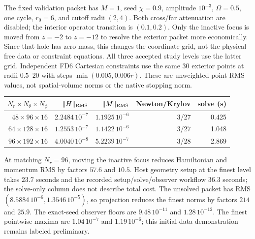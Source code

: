 \documentclass[aps,prd,preprint,notitlepage,nofootinbib]{revtex4-2}
\begin{document}
The fixed validation packet has $M=1$, seed $\chi=0.9$, amplitude
$10^{-3}$, $\Omega=0.5$, one cycle, $r_0=6$, and cutoff radii $(2,4)$.
Both cross/far attenuation are disabled; the interior operator transition
is $(0.1,0.2)$. Only the inactive focus is moved from $z=-2$ to $z=-12$ to
resolve the exterior packet more economically. Since that hole has zero
mass, this changes the coordinate grid, not the physical free data or
constraint equations. All three accepted study levels use the latter grid.
Independent FD6 Cartesian constraints use the same 30 exterior points at
radii $0.5$--$20$ with steps $\min(0.005,0.006r)$. These are unweighted
point RMS values, not spatial-volume norms or the native stopping norm.
\begin{center}
\begin{tabular}{rrrrr}
\toprule
$N_r\times N_\theta\times N_\phi$ & $\|H\|_{\rm RMS}$ &
$\|M\|_{\rm RMS}$ & Newton/Krylov & solve (s)\\
\midrule
$48\times96\times16$ & $2.2484\,10^{-7}$ & $1.1925\,10^{-6}$ & 3/27 & 0.425\\
$64\times128\times16$ & $1.2553\,10^{-7}$ & $1.1422\,10^{-6}$ & 3/27 & 1.048\\
$96\times192\times16$ & $4.0040\,10^{-8}$ & $5.2239\,10^{-7}$ & 3/28 & 2.869\\
\bottomrule
\end{tabular}
\end{center}
At matching $N_r=96$, moving the inactive focus reduces Hamiltonian and
momentum RMS by factors $57.6$ and $10.5$. Host geometry setup at the finest
level takes $23.7$ seconds and the recorded setup/solve/observer workflow
$36.3$ seconds; the solve-only column does not describe total cost.
The unsolved packet has RMS $(8.5884\,10^{-6},1.3546\,10^{-5})$, so projection
reduces the finest norms by factors $214$ and $25.9$. The exact-seed observer
floors are $9.48\,10^{-11}$ and $1.28\,10^{-12}$.
The finest pointwise maxima are $1.04\,10^{-7}$ and $1.19\,10^{-6}$;
this initial-data demonstration remains labeled preliminary.
\end{document}
